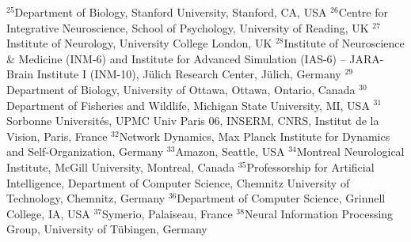 $^{25}$Department of Biology, Stanford University, Stanford, CA, USA
$^{26}$Centre for Integrative Neuroscience, School of Psychology, University of Reading, UK
$^{27}$Institute of Neurology, University College London, UK
$^{28}$Institute of Neuroscience \& Medicine (INM-6) and Institute for Advanced Simulation (IAS-6) -- JARA-Brain Institute I (INM-10), Jülich Research Center, Jülich, Germany
$^{29}$Department of Biology, University of Ottawa, Ottawa, Ontario, Canada
$^{30}$Department of Fisheries and Wildlife, Michigan State University, MI, USA
$^{31}$Sorbonne Universités, UPMC Univ Paris 06, INSERM, CNRS, Institut de la Vision, Paris, France
$^{32}$Network Dynamics, Max Planck Institute for Dynamics and Self-Organization, Germany
$^{33}$Amazon, Seattle, USA
$^{34}$Montreal Neurological Institute, McGill University, Montreal, Canada
$^{35}$Professorship for Artificial Intelligence, Department of Computer Science, Chemnitz University of Technology, Chemnitz, Germany
$^{36}$Department of Computer Science, Grinnell College, IA, USA
$^{37}$Symerio, Palaiseau, France
$^{38}$Neural Information Processing Group, University of Tübingen, Germany
\par